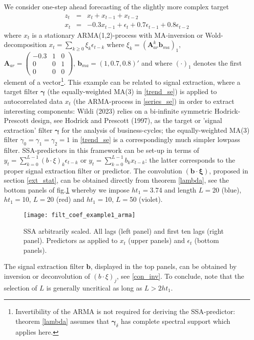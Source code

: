 \documentclass[a4paper]{article}
\begin{document}
We consider one-step ahead forecasting of the slightly more complex target 
\begin{eqnarray}
z_t&=&x_t+x_{t-1}+x_{t-2}\label{trend_se}\\
x_t&=&-0.3x_{t-1}+\epsilon_t+0.7\epsilon_{t-1}+0.8\epsilon_{t-2}\label{series_se}
\end{eqnarray}
where $x_t$ is a stationary ARMA(1,2)-process with MA-inversion or Wold-decomposition $x_t=\sum_{k\geq 0}\xi_k\epsilon_{t-k}$ where $\xi_k=\left(\mathbf{A}_{ar}^k\mathbf{b}_{ma}\right)_1$, $\mathbf{A}_{ar}=\left(\begin{array}{ccc}-0.3&1&0\\0&0&1\\0&0&0\end{array}\right)$, $\mathbf{b}_{ma}=(1,0.7,0.8)'$ and where $(\cdot)_1$ denotes the first element of a vector\footnote{Invertibility of the ARMA is not required for deriving the SSA-predictor: theorem \ref{lambda} assumes that $\boldsymbol{\gamma}_{\delta}$ has complete spectral support which applies here.}. This example can be related to signal extraction, where a target filter $\boldsymbol{\gamma}$ (the equally-weighted MA(3) in \ref{trend_se}) is applied to autocorrelated data $x_t$ (the ARMA-process in \ref{series_se}) in order to extract interesting components: Wildi (2023) relies on a bi-infinite symmetric Hodrick-Prescott design, see Hodrick and Prescott (1997), as the target or 'signal extraction' filter $\boldsymbol{\gamma}$ for the analysis of business-cycles; the equally-weighted MA(3) filter $\gamma_0=\gamma_1=\gamma_2=1$ in \ref{trend_se} is a correspondingly much simpler lowpass filter. 
SSA-predictors in this framework can be set-up in terms of $y_t=\sum_{k=0}^{L-1}(b\cdot\xi)_k\epsilon_{t-k}$ or $y_t=\sum_{k=0}^{L-1}b_kx_{t-k}$: the latter corresponds to the proper signal extraction filter or predictor. The convolution $(\mathbf{b}\cdot\boldsymbol{\xi})$, proposed in section \ref{ext_stat}, can be obtained directly from theorem \ref{lambda}, see the bottom panels of fig.\ref{filt_coef_example1_arma} whereby we impose $ht_1=$3.74 and length $L=$20 (blue), $ht_1=$10, $L=$20 (red) and $ht_1=$10, $L=$50 (violet).
\begin{figure}[H]\begin{center}\texttt{[image: filt\_coef\_example1\_arma]}\caption{SSA arbitrarily scaled. All lags (left panel) and first ten lags (right panel). Predictors  as applied to $x_t$ (upper panels)  and $\epsilon_t$ (bottom panels). \label{filt_coef_example1_arma}}\end{center}\end{figure}The signal extraction filter $\mathbf{b}$, displayed in the top panels, can be obtained by inversion or deconvolution of $(b\cdot\xi)_j$, see \ref{con_inv}. To conclude, note that the selection of $L$ is generally uncritical as long as $L>2ht_1$. 
 
\end{document}
